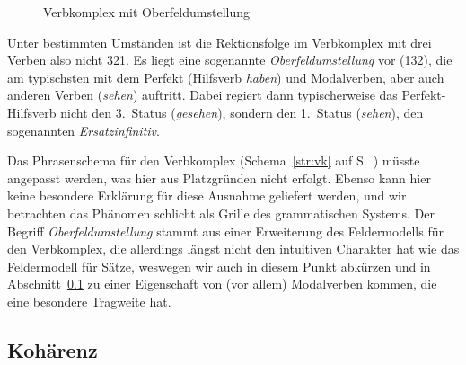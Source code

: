 \begin{figure}[!htbp]
  \centering
  \caption{Verbkomplex mit Oberfeldumstellung}
  \label{fig:oberfeldum}
\end{figure}

Unter bestimmten Umständen ist die Rektionsfolge im Verbkomplex mit drei Verben also nicht 321.
Es liegt eine sogenannte \textit{Oberfeldumstellung} vor (132), die am typischsten mit dem Perfekt (Hilfsverb \textit{haben}) und Modalverben, aber auch anderen Verben (\zB \textit{sehen}) auftritt.
Dabei regiert dann typischerweise das Perfekt-Hilfsverb nicht den 3.~Status (\textit{gesehen}), sondern den 1.~Status (\textit{sehen}), den sogenannten \textit{Ersatzinfinitiv}.


Das Phrasenschema für den Verbkomplex (Schema~\ref{str:vk} auf S.~\pageref{str:vk}) müsste angepasst werden, was hier aus Platzgründen nicht erfolgt.
Ebenso kann hier keine besondere Erklärung für diese Ausnahme geliefert werden, und wir betrachten das Phänomen schlicht als Grille des grammatischen Systems.
Der Begriff \textit{Oberfeldumstellung} stammt aus einer Erweiterung des Feldermodells für den Verbkomplex, die allerdings längst nicht den intuitiven Charakter hat wie das Feldermodell für Sätze, weswegen wir auch in diesem Punkt abkürzen und in Abschnitt~\ref{sec:kohaerenz} zu einer Eigenschaft von (vor allem) Modalverben kommen, die eine besondere Tragweite hat.

\subsection{Kohärenz}

\label{sec:kohaerenz}

